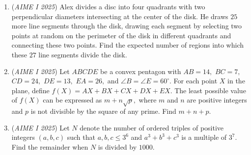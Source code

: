 \begin{enumerate}
	\item (\textit{AIME I 2025}) Alex divides a disc into four quadrants with two perpendicular diameters intersecting at the center of the disk. He draws $25$ more line segments through the disk, drawing each segment by selecting two points at random on the perimeter of the disk in different quadrants and connecting these two points. Find the expected number of regions into which these $27$ line segments divide the disk.


 

	\item (\textit{AIME I 2025}) Let $ABCDE$ be a convex pentagon with $AB=14,$ $BC=7,$ $CD=24,$ $DE=13,$ $EA=26,$ and $\angle B=\angle E=60^{\circ}.$ For each point $X$ in the plane, define $f(X)=AX+BX+CX+DX+EX.$ The least possible value of $f(X)$ can be expressed as $m+n\sqrt{p},$ where $m$ and $n$ are positive integers and $p$ is not divisible by the square of any prime. Find $m+n+p.$


	\item (\textit{AIME I 2025}) Let $N$ denote the number of ordered triples of positive integers $(a, b, c)$ such that $a, b, c \leq 3^6$ and $a^3 + b^3 + c^3$ is a multiple of $3^7$. Find the remainder when $N$ is divided by $1000$.


 

\end{enumerate}